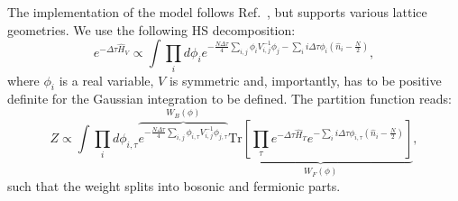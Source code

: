 The implementation of the model follows Ref.~\cite{Hohenadler14}, but supports various lattice geometries.  We use  the following  HS decomposition:
\begin{equation}
e^{-\Delta \tau \hat{H}_V }  \propto \int \prod_{i} d \phi_{i}   e^{ - \frac{N \Delta \tau} {4} \sum_{i,j} \phi_{i} V^{-1}_{i,j}  \phi_{j} - \sum_{i}  i \Delta \tau \phi_i \left( \hat{n}_{i} - \frac{N}{2} \right) } ,
\end{equation}
where $\phi_i $ is a  real  variable, $V$ is symmetric and, importantly, has to be  positive definite  for the Gaussian integration to be defined. 
The partition function  reads:
\begin{equation}
	Z \propto \int \prod_{i} d \phi_{i, \tau} \overbrace{e^{ - \frac{N \Delta \tau} {4} \sum_{i,j} \phi_{i,\tau} V^{-1}_{i,j}  \phi_{j,\tau}} }^{W_B(\phi)}\underbrace{\text{Tr} \left[   \prod_{\tau}   
	 e^{-\Delta \tau \hat{H}_T}  e^{- \sum_{i}  i \Delta \tau \phi_{i,\tau} \left( \hat{n}_{i} - \frac{N}{2} \right) }\right]}_{W_F(\phi)},
\end{equation}
such that the weight splits into bosonic and fermionic parts. 
 
 
